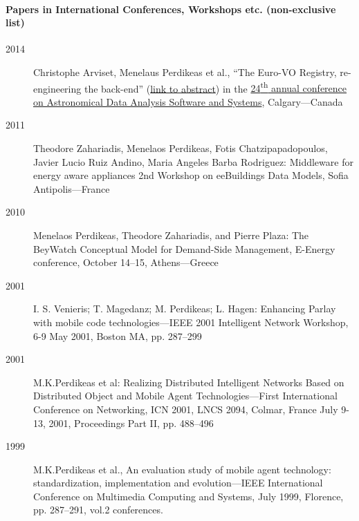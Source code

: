 \documentclass[10pt,a4paper]{article} %
\begin{document}
\paragraph{Papers in International Conferences, Workshops etc. (non-exclusive list)}
\begin{description}
\item[2014] Christophe Arviset, Menelaus Perdikeas et al., ``The Euro-VO Registry, re-engineering the back-end'' (\href{http://adsabs.harvard.edu/abs/2015ASPC..495..457A}{link to abstract}) in the \href{http://www.adass2014.org/announcements_en.php}{24\textsuperscript{th} annual conference on Astronomical Data Analysis Software and Systems}, Calgary---Canada
\item[2011] Theodore Zahariadis, Menelaos Perdikeas, Fotis Chatzipapadopoulos, Javier Lucio Ruiz Andino,
  Maria Angeles Barba Rodriguez: Middleware for energy aware appliances
  2nd Workshop on eeBuildings Data Models, Sofia Antipolis---France
\item[2010] Menelaos Perdikeas, Theodore Zahariadis, and Pierre Plaza: The BeyWatch Conceptual Model for Demand-Side Management, E-Energy conference, October 14--15, Athens---Greece
\item[2001] I. S. Venieris; T. Magedanz; M. Perdikeas; L. Hagen: Enhancing Parlay with mobile code technologies---IEEE 2001 Intelligent Network Workshop, 6-9 May 2001, Boston MA, pp. 287--299
\item[2001] M.K.Perdikeas et al: Realizing Distributed Intelligent Networks Based on Distributed Object and Mobile Agent Technologies---First International Conference on Networking, ICN 2001, LNCS 2094, Colmar, France July 9-13, 2001, Proceedings Part II, pp. 488--496
\item[1999] M.K.Perdikeas et al., An evaluation study of mobile agent technology: standardization, implementation and evolution---IEEE International Conference on Multimedia Computing and Systems, July 1999, Florence, pp. 287--291, vol.2
  conferences.
  
\end{description}
\end{document}
